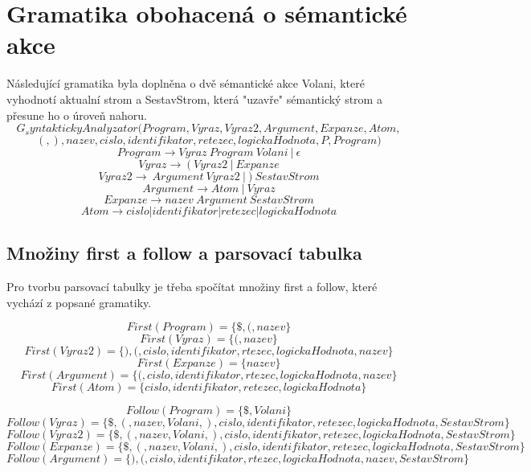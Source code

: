 \documentclass[a4paper,11pt]{article}
\begin{document}
\section{Gramatika obohacená o sémantické akce}
Následující gramatika byla doplněna o dvě sémantické akce Volani, které vyhodnotí aktualní strom a SestavStrom, která "uzavře" sémantický strom a přesune ho o úroveň nahoru.
$$G_syntaktickyAnalyzator({Program, Vyraz, Vyraz2, Argument, Expanze, Atom},$$
$${(, ), nazev, cislo, identifikator, retezec, logickaHodnota},
P,
Program)$$
$$Program \rightarrow Vyraz\:Program\:Volani\:|\:\epsilon$$
$$Vyraz \rightarrow\:(\:Vyraz2\:|\:Expanze$$
$$Vyraz2 \rightarrow\:Argument\:Vyraz2\:|\:)\:SestavStrom$$
$$Argument \rightarrow Atom\:|\:Vyraz$$
$$Expanze \rightarrow nazev\:Argument\:SestavStrom$$
$$Atom \rightarrow cislo | identifikator | retezec | logickaHodnota$$

\subsection{Množiny first a follow a parsovací tabulka}
Pro tvorbu parsovací tabulky je třeba spočítat množiny first a follow, které vychází z popsané gramatiky.

$$First(Program) = \{\$, (, nazev\}$$
$$First(Vyraz) =  \{(,nazev\}$$
$$First(Vyraz2) = \{),(,cislo,identifikator,rtezec,logickaHodnota,nazev\}$$
$$First(Expanze) = \{ nazev \}$$
$$First(Argument) = \{(,cislo,identifikator,rtezec,logickaHodnota,nazev\}$$
$$First(Atom) = \{cislo, identifikator, retezec, logickaHodnota\}$$

$$Follow(Program) = \{\$, Volani\}$$
$$Follow(Vyraz) = \{\$,(,nazev,Volani,),cislo,identifikator,retezec,logickaHodnota,SestavStrom\}$$
$$Follow(Vyraz2) = \{\$,(,nazev,Volani,),cislo,identifikator,retezec,logickaHodnota,SestavStrom\}$$
$$Follow(Expanze) = \{\$,(,nazev,Volani,),cislo,identifikator,retezec,logickaHodnota,SestavStrom\}$$
$$Follow(Argument) = \{),(,cislo,identifikator,rtezec,logickaHodnota,nazev,SestavStrom\}$$
\end{document}
